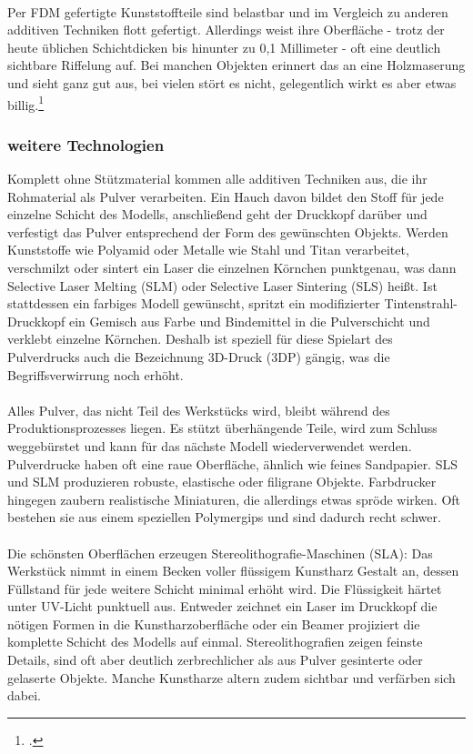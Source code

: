 \\
\noindent
Per FDM gefertigte Kunststoffteile sind belastbar und im Vergleich zu anderen additiven Techniken flott gefertigt. Allerdings weist ihre Oberfläche - trotz der heute üblichen Schichtdicken bis hinunter zu 0,1 Millimeter - oft eine deutlich sichtbare Riffelung auf. Bei manchen Objekten erinnert das an eine Holzmaserung und sieht ganz gut aus, bei vielen stört es nicht, gelegentlich wirkt es aber etwas billig.\footcite{shit_3d_spiegel}

\subsubsection{weitere Technologien}
Komplett ohne Stützmaterial kommen alle additiven Techniken aus, die ihr Rohmaterial als Pulver verarbeiten. Ein Hauch davon bildet den Stoff für jede einzelne Schicht des Modells, anschließend geht der Druckkopf darüber und verfestigt das Pulver entsprechend der Form des gewünschten Objekts. Werden Kunststoffe wie Polyamid oder Metalle wie Stahl und Titan verarbeitet, verschmilzt oder sintert ein Laser die einzelnen Körnchen punktgenau, was dann Selective Laser Melting (SLM) oder Selective Laser Sintering (SLS) heißt. Ist stattdessen ein farbiges Modell gewünscht, spritzt ein modifizierter Tintenstrahl-Druckkopf ein Gemisch aus Farbe und Bindemittel in die Pulverschicht und verklebt einzelne Körnchen. Deshalb ist speziell für diese Spielart des Pulverdrucks auch die Bezeichnung 3D-Druck (3DP) gängig, was die Begriffsverwirrung noch erhöht.\\
\\
Alles Pulver, das nicht Teil des Werkstücks wird, bleibt während des Produktionsprozesses liegen. Es stützt überhängende Teile, wird zum Schluss weggebürstet und kann für das nächste Modell wiederverwendet werden. Pulverdrucke haben oft eine raue Oberfläche, ähnlich wie feines Sandpapier. SLS und SLM produzieren robuste, elastische oder filigrane Objekte. Farbdrucker hingegen zaubern realistische Miniaturen, die allerdings etwas spröde wirken. Oft bestehen sie aus einem speziellen Polymergips und sind dadurch recht schwer.\\
\\
Die schönsten Oberflächen erzeugen Stereolithografie-Maschinen (SLA): Das Werkstück nimmt in einem Becken voller flüssigem Kunstharz Gestalt an, dessen Füllstand für jede weitere Schicht minimal erhöht wird. Die Flüssigkeit härtet unter UV-Licht punktuell aus. Entweder zeichnet ein Laser im Druckkopf die nötigen Formen in die Kunstharzoberfläche oder ein Beamer projiziert die komplette Schicht des Modells auf einmal. Stereolithografien zeigen feinste Details, sind oft aber deutlich zerbrechlicher als aus Pulver gesinterte oder gelaserte Objekte. Manche Kunstharze altern zudem sichtbar und verfärben sich dabei.\\
